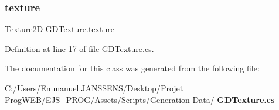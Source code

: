 \subsubsection{texture}
{\footnotesize\ttfamily Texture2D G\+D\+Texture.\+texture}



Definition at line 17 of file G\+D\+Texture.\+cs.



The documentation for this class was generated from the following file\+:\begin{DoxyCompactItemize}
\item 
C\+:/\+Users/\+Emmanuel.\+J\+A\+N\+S\+S\+E\+N\+S/\+Desktop/\+Projet Prog\+W\+E\+B/\+E\+J\+S\+\_\+\+P\+R\+O\+G/\+Assets/\+Scripts/\+Generation Data/\textbf{ G\+D\+Texture.\+cs}\end{DoxyCompactItemize}
